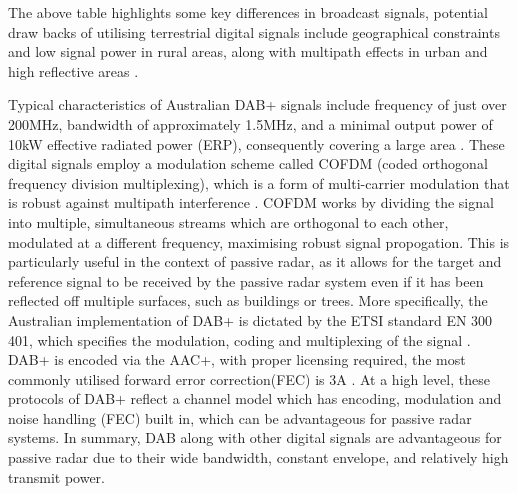 The above table highlights some key differences in broadcast signals, potential draw backs of utilising terrestrial digital signals include geographical constraints and low signal power in rural areas, along with multipath effects in urban and high reflective areas \cite{DTSO2009}. 


\par \vspace{0.5cm} 
\noindent Typical characteristics of Australian DAB+ signals include frequency of just over 200MHz, bandwidth of approximately 1.5MHz, and a minimal output power of 10kW effective radiated power (ERP), consequently covering a large area \cite{DABfeatures}. These digital signals employ a modulation scheme called COFDM (coded orthogonal frequency division multiplexing), which is a form of multi-carrier modulation that is robust against multipath interference \cite{INTRO2017}. COFDM works by dividing the signal into multiple, simultaneous streams which are orthogonal to each other, modulated at a different frequency, maximising robust signal propogation. This is particularly useful in the context of passive radar, as it allows for the target and reference signal to be received by the passive radar system even if it has been reflected off multiple surfaces, such as buildings or trees. More specifically, the Australian implementation of DAB+ is dictated by the ETSI standard EN 300 401, which specifies the modulation, coding and multiplexing of the signal \cite{etsi_DAB_standard}. DAB+ is encoded via the AAC+, with proper licensing required, the most commonly utilised forward error correction(FEC) is 3A \cite{DABaustralia}. At a high level, these protocols of DAB+ reflect a channel model which has encoding, modulation and noise handling (FEC) built in, which can be advantageous for passive radar systems. In summary, DAB along with other digital signals are advantageous for passive radar due to their wide bandwidth, constant envelope, and relatively high transmit power\cite{DABambiguity}. 

